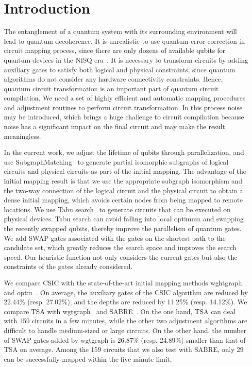 \documentclass[runningheads]{llncs}
\begin{document}
\section{Introduction}
\label{Introduction}
The entanglement of a quantum system with its surrounding environment will lead to quantum decoherence. It is unrealistic to use quantum error correction in circuit mapping process, since there are only dozens of available qubits for quantum devices in the NISQ era~\cite{2018QuantumPreskill}. It is necessary to transform circuits by adding auxiliary gates to satisfy both logical and physical constraints, since quantum algorithms do not consider any hardware connectivity constraints. Hence, quantum circuit transformation is an important part of quantum circuit compilation. We need a set of highly efficient and automatic mapping procedures and adjustment routines to perform circuit transformation. In this process noise may be introduced, which brings a huge challenge to circuit compilation because noise has a significant impact on the final circuit and may make the result meaningless. 

In the current work, we adjust the lifetime of qubits through parallelization, and use SubgraphMatching~\cite{Sun2020} to generate partial isomorphic subgraphs of logical circuits %
and physical circuits %
as part of the initial mapping. The advantage of the initial mapping result is that we use the appropriate subgraph isomorphism and the two-way connection of the logical circuit and the physical circuit to obtain a dense initial mapping, which avoids certain nodes from being mapped to remote locations. We use Tabu search~\cite{Glover1990} to generate circuits that can be executed on physical devices. Tabu search can avoid falling into local optimum and swapping the recently swapped qubits, thereby improve the parallelism of quantum gates. We add SWAP gates associated with the gates on the shortest path to the candidate set, which greatly reduces the search space and improves the search speed. Our heuristic function not only considers the current gates but also the constraints of the gates already considered.

We compare CSIC with the state-of-the-art initial mapping methods wghtgraph~\cite{2020Qubit} and optm~\cite{Zulehner2017}. On average, the auxiliary gates of the CSIC algorithm are reduced by 22.44\% (resp. 27.02\%), and the depths are reduced by 11.25\% (resp. 14.12\%). We compare TSA with wgtgraph~\cite{2020Qubit} and SABRE~\cite{Li2018}. On the one hand, TSA can deal with 159 circuits in a few minutes, while the  other two adjustment algorithms are difficult to handle medium-sized or large circuits. On the other hand, the number of SWAP gates added by wgtgraph is 26.87\% (resp. 24.89\%) smaller than that of  TSA on average. Among the 159 circuits that we also test with SABRE, only 29  can be successfully mapped within the five-minute limit.
\end{document}
